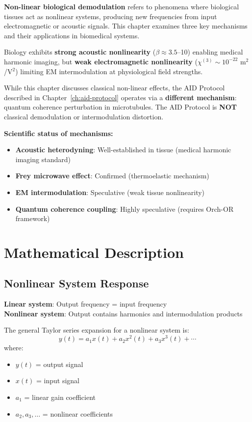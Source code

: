 \textbf{Non-linear biological demodulation} refers to phenomena where biological tissues act as nonlinear systems, producing new frequencies from input electromagnetic or acoustic signals. This chapter examines three key mechanisms and their applications in biomedical systems.

\begin{keyconcept}
Biology exhibits \textbf{strong acoustic nonlinearity} ($\beta \approx 3.5$--10) enabling medical harmonic imaging, but \textbf{weak electromagnetic nonlinearity} ($\chi^{(3)} \sim 10^{-22}$ m$^2$/V$^2$) limiting EM intermodulation at physiological field strengths.
\end{keyconcept}

\begin{importantbox}
While this chapter discusses classical non-linear effects, the AID Protocol described in Chapter~\ref{ch:aid-protocol} operates via a \textbf{different mechanism}: quantum coherence perturbation in microtubules. The AID Protocol is \textbf{NOT} classical demodulation or intermodulation distortion.
\end{importantbox}

\textbf{Scientific status of mechanisms:}
\begin{itemize}
\item \textbf{Acoustic heterodyning}: Well-established in tissue (medical harmonic imaging standard)
\item \textbf{Frey microwave effect}: Confirmed (thermoelastic mechanism)
\item \textbf{EM intermodulation}: Speculative (weak tissue nonlinearity)
\item \textbf{Quantum coherence coupling}: Highly speculative (requires Orch-OR framework)
\end{itemize}

\section{Mathematical Description}

\subsection{Nonlinear System Response}

\textbf{Linear system}: Output frequency = input frequency\\
\textbf{Nonlinear system}: Output contains harmonics and intermodulation products

The general Taylor series expansion for a nonlinear system is:
\begin{equation}
\label{eq:nonlinear-series}
y(t) = a_1 x(t) + a_2 x^2(t) + a_3 x^3(t) + \cdots
\end{equation}
where:
\begin{itemize}
\item $y(t)$ = output signal
\item $x(t)$ = input signal
\item $a_1$ = linear gain coefficient
\item $a_2, a_3, \ldots$ = nonlinear coefficients
\end{itemize}


